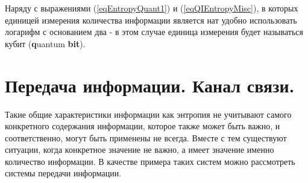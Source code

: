
Наряду с выражениями (\ref{eqEntropyQuant1}) и (\ref{eqQIEntropyMisc}),
в которых единицей измерения количества информации является нат удобно
использовать логарифм с основанием два - в этом случае единица
измерения будет называться кубит ({\bf q}uantum {\bf bit}).

\section{Передача информации. Канал связи.}

Такие общие характеристики информации как энтропия не учитывают самого
конкретного содержания информации, которое также может быть важно, и
соответственно, могут быть применены не всегда. 
Вместе с тем существуют ситуации, когда конкретное значение не важно,
а имеет значение именно количество информации. В качестве 
примера таких систем можно рассмотреть системы передачи информации.




